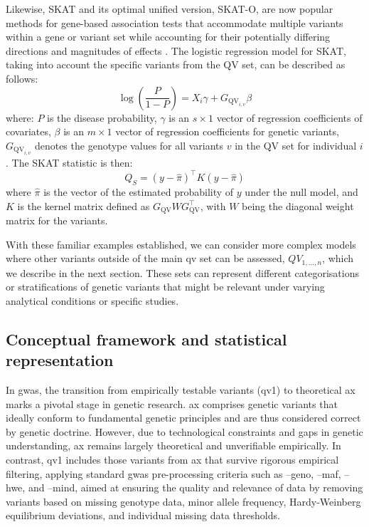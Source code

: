 Likewise, SKAT and its optimal unified version, SKAT-O, are now popular methods for gene-based association tests that accommodate multiple variants within a gene or variant set while accounting for their potentially differing directions and magnitudes of effects
\cite{wu2011rare, lee2012optimal}. 
The logistic regression model for SKAT, taking into account the specific variants from the QV set, can be described as follows:
$$
\log \left( \frac{P}{1-P} \right) = X_i \gamma + G_{\text{QV}_{i,v}} \beta
$$
where:
\( P \) is the disease probability,
\( \gamma \) is an \( s \times 1 \) vector of regression coefficients of covariates,
\( \beta \) is an \( m \times 1 \) vector of regression coefficients for genetic variants,
\( G_{\text{QV}_{i,v}} \) denotes the genotype values for all variants \( v \) in the QV set for individual \( i \).
The SKAT statistic is then:
$$
Q_S = (y - \hat{\pi})^\top K (y - \hat{\pi})
$$
where \( \hat{\pi} \) is the vector of the estimated probability of \( y \) under the null model, and \( K \) is the kernel matrix defined as \( G_{\text{QV}} W G_{\text{QV}}^\top \), with \( W \) being the diagonal weight matrix for the variants.

With these familiar examples established, we can consider more complex models where other variants outside of the main \ac{qv} set can be assessed,  $QV_{1,...,n} $,
which we describe in the next section. 
These sets can represent different categorisations or stratifications of genetic variants that might be relevant under varying analytical conditions or specific studies.

\subsection{Conceptual framework and statistical representation}

In \ac{gwas}, the transition from empirically testable variants (\ac{qv}1) to theoretical \ac{ax} marks a pivotal stage in genetic research.
\ac{ax} comprises genetic variants that ideally conform to fundamental genetic principles and are thus considered correct by genetic doctrine. 
However, due to technological constraints and gaps in genetic understanding, \ac{ax} remains largely theoretical and unverifiable empirically. 
In contrast, \ac{qv}1 includes those variants from \ac{ax} that survive rigorous empirical filtering, applying standard \ac{gwas} pre-processing criteria such as --geno, --maf, --hwe, and --mind, aimed at ensuring the quality and relevance of data by removing variants based on missing genotype data, minor allele frequency, Hardy-Weinberg equilibrium deviations, and individual missing data thresholds.

